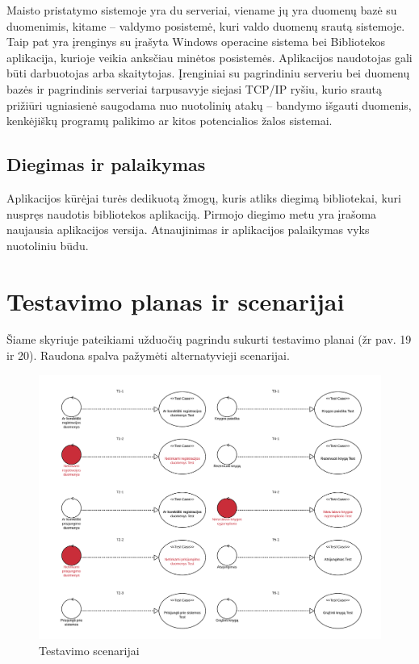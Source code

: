 \documentclass{VUMIFPSkursinis}
\begin{document}
Maisto pristatymo sistemoje yra du serveriai, viename jų yra duomenų bazė su
duomenimis, kitame – valdymo posistemė, kuri valdo duomenų srautą sistemoje. Taip pat yra
įrenginys su įrašyta Windows operacine sistema bei Bibliotekos aplikacija, kurioje
veikia anksčiau minėtos posistemės. Aplikacijos naudotojas gali būti darbuotojas arba skaitytojas.
Įrenginiai su pagrindiniu serveriu bei duomenų bazės ir pagrindinis serveriai tarpusavyje siejasi
TCP/IP ryšiu, kurio srautą prižiūri ugniasienė saugodama nuo nuotolinių atakų – bandymo
išgauti duomenis, kenkėjiškų programų palikimo ar kitos potencialios žalos sistemai.

\subsection{Diegimas ir palaikymas}
Aplikacijos kūrėjai turės dedikuotą žmogų, kuris atliks diegimą bibliotekai, kuri nuspręs naudotis bibliotekos aplikaciją. Pirmojo diegimo metu yra įrašoma naujausia aplikacijos versija. Atnaujinimas ir aplikacijos palaikymas vyks nuotoliniu būdu. 


\section{Testavimo planas ir scenarijai}

Šiame skyriuje pateikiami užduočių pagrindu sukurti testavimo planai (žr pav. 19 ir 20). Raudona spalva pažymėti alternatyvieji scenarijai. 


\begin{figure}[H]
    \label{fig:testavimoscenarijai}
    \centering
    \includegraphics[page = 1, width=1.1 \textwidth]{Testavimo_Scenarijai/TestavimoScenarijai}
    \caption{Testavimo scenarijai}
\end{figure}
\end{document}
